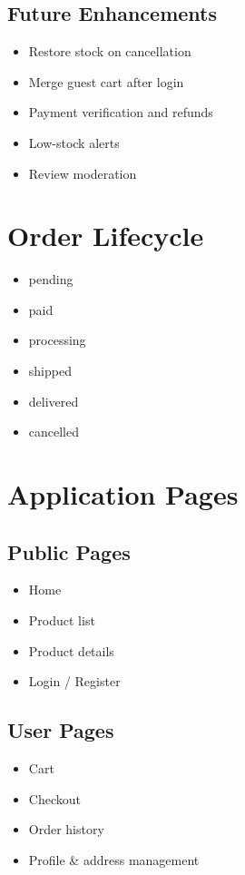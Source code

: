 \documentclass[12pt,a4paper]{article}
\begin{document}
\subsection{Future Enhancements}
\begin{itemize}[noitemsep]
    \item Restore stock on cancellation
    \item Merge guest cart after login
    \item Payment verification and refunds
    \item Low-stock alerts
    \item Review moderation
\end{itemize}

\section{Order Lifecycle}

\begin{itemize}[noitemsep]
    \item pending
    \item paid
    \item processing
    \item shipped
    \item delivered
    \item cancelled
\end{itemize}

\section{Application Pages}

\subsection{Public Pages}
\begin{itemize}[noitemsep]
    \item Home
    \item Product list
    \item Product details
    \item Login / Register
\end{itemize}

\subsection{User Pages}
\begin{itemize}[noitemsep]
    \item Cart
    \item Checkout
    \item Order history
    \item Profile \& address management
\end{itemize}
\end{document}
